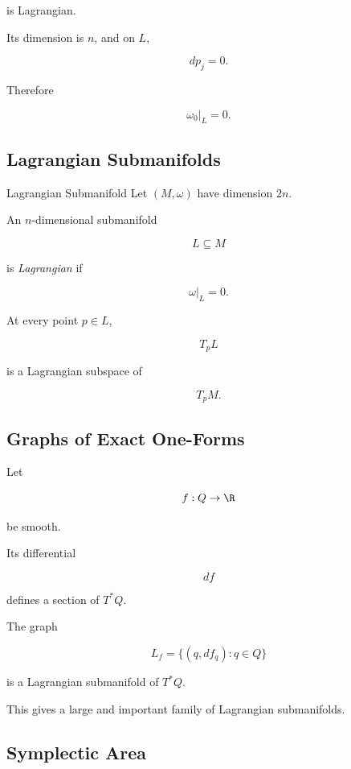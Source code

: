 is Lagrangian.

Its dimension is \(n\), and on \(L\),

\[
dp_j=0.
\]

Therefore

\[
\omega_0|_L=0.
\]

\subsection{Lagrangian Submanifolds}
\label{subsec:lagrangian-submanifolds}

\begin{definitionbox}{Lagrangian Submanifold}
Let \((M,\omega)\) have dimension \(2n\).

An \(n\)-dimensional submanifold

\[
L\subseteq M
\]

is \emph{Lagrangian} if

\[
\boxed{
\omega|_L=0.
}
\]
\end{definitionbox}

At every point \(p\in L\),

\[
T_pL
\]

is a Lagrangian subspace of

\[
T_pM.
\]

\subsection{Graphs of Exact One-Forms}
\label{subsec:graphs-exact-one-forms}

Let

\[
f:Q\to\R
\]

be smooth.

Its differential

\[
df
\]

defines a section of \(T^*Q\).

The graph

\[
\boxed{
L_f
=
\{(q,df_q):q\in Q\}
}
\]

is a Lagrangian submanifold of \(T^*Q\).

This gives a large and important family of Lagrangian submanifolds.

\subsection{Symplectic Area}
\label{subsec:symplectic-area}

